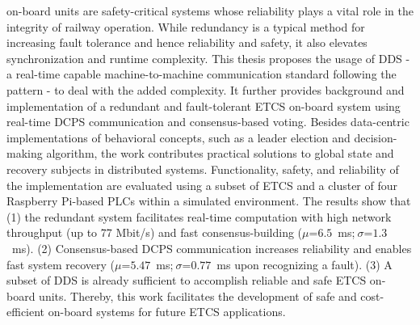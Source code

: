 
\null\vfil
\begin{center}\textsf{\textbf{\abstractname}}\end{center}
%
\noindent {} on-board units are safety-critical systems whose reliability plays a vital role in the integrity of railway operation.
While redundancy is a typical method for increasing fault tolerance and hence reliability and safety, it also elevates synchronization and runtime complexity.
This thesis proposes the usage of DDS - a real-time capable machine-to-machine communication standard following the  pattern - to deal with the added complexity.
It further provides background and implementation of a redundant and fault-tolerant ETCS on-board system using real-time DCPS communication and consensus-based voting.
Besides data-centric implementations of behavioral concepts, such as a leader election and decision-making algorithm, the work contributes practical solutions to global state and recovery subjects in distributed systems.
Functionality, safety, and reliability of the implementation are evaluated using a subset of ETCS and a cluster of four Raspberry Pi-based PLCs within a simulated environment.
The results show that (1) the redundant system facilitates real-time computation with high network throughput (up to 77 Mbit/s) and fast consensus-building ($\mu$=$6.5$~ms;$~\sigma$=$1.3$~ms). (2) Consensus-based DCPS communication increases reliability and enables fast system recovery ($\mu$=$5.47$~ms;$~\sigma$=$0.77$~ms upon recognizing a fault).
(3) A subset of DDS is already sufficient to accomplish reliable and safe ETCS on-board units.
Thereby, this work facilitates the development of safe and cost-efficient on-board systems for future ETCS applications.

\vfil\null
\clearpage


